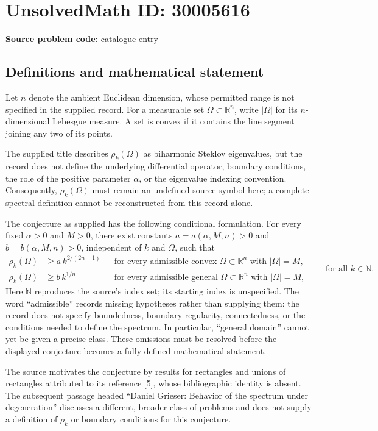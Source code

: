 \documentclass[11pt]{article}
\newcommand{\N}{\mathbb{N}}
\newcommand{\R}{\mathbb{R}}
\begin{document}
\section*{UnsolvedMath ID: 30005616}
\textbf{Source problem code:} catalogue entry
\subsection{Definitions and mathematical statement}
Let \(n\) denote the ambient Euclidean dimension, whose permitted range is not specified in the supplied record. For a measurable set \(\Omega\subset\R^n\), write \(|\Omega|\) for its \(n\)-dimensional Lebesgue measure. A set is convex if it contains the line segment joining any two of its points.

The supplied title describes \(\rho_k(\Omega)\) as biharmonic Steklov eigenvalues, but the record does not define the underlying differential operator, boundary conditions, the role of the positive parameter \(\alpha\), or the eigenvalue indexing convention. Consequently, \(\rho_k(\Omega)\) must remain an undefined source symbol here; a complete spectral definition cannot be reconstructed from this record alone.

The conjecture as supplied has the following conditional formulation. For every fixed \(\alpha>0\) and \(M>0\), there exist constants \(a=a(\alpha,M,n)>0\) and \(b=b(\alpha,M,n)>0\), independent of \(k\) and \(\Omega\), such that
\[
\begin{aligned}
\rho_k(\Omega)&\geq a\,k^{2/(2n-1)}
&&\text{for every admissible convex }\Omega\subset\R^n\text{ with }|\Omega|=M,\\
\rho_k(\Omega)&\geq b\,k^{1/n}
&&\text{for every admissible general }\Omega\subset\R^n\text{ with }|\Omega|=M,
\end{aligned}
\qquad\text{for all }k\in\N.
\]
Here \(\N\) reproduces the source's index set; its starting index is unspecified. The word ``admissible'' records missing hypotheses rather than supplying them: the record does not specify boundedness, boundary regularity, connectedness, or the conditions needed to define the spectrum. In particular, ``general domain'' cannot yet be given a precise class. These omissions must be resolved before the displayed conjecture becomes a fully defined mathematical statement.

The source motivates the conjecture by results for rectangles and unions of rectangles attributed to its reference [5], whose bibliographic identity is absent. The subsequent passage headed ``Daniel Grieser: Behavior of the spectrum under degeneration'' discusses a different, broader class of problems and does not supply a definition of \(\rho_k\) or boundary conditions for this conjecture.
\end{document}

